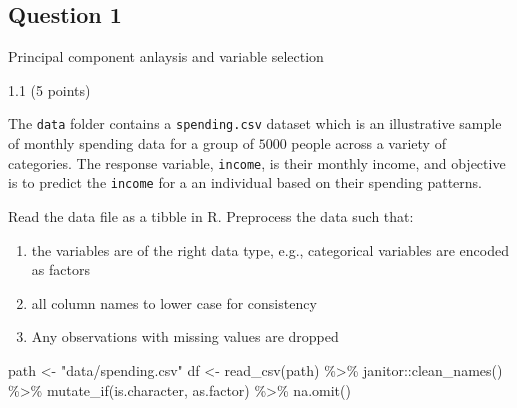 \documentclass[
  letterpaper,
  DIV=11,
  numbers=noendperiod]{scrartcl}
\newenvironment{Shaded}{\begin{snugshade}}{\end{snugshade}}
\newcommand{\FunctionTok}[1]{\textcolor[rgb]{0.28,0.35,0.67}{#1}}
\newcommand{\NormalTok}[1]{\textcolor[rgb]{0.00,0.23,0.31}{#1}}
\newcommand{\OtherTok}[1]{\textcolor[rgb]{0.00,0.23,0.31}{#1}}
\newcommand{\SpecialCharTok}[1]{\textcolor[rgb]{0.37,0.37,0.37}{#1}}
\newcommand{\StringTok}[1]{\textcolor[rgb]{0.13,0.47,0.30}{#1}}
\providecommand{\tightlist}{%
  \setlength{\itemsep}{0pt}\setlength{\parskip}{0pt}}\usepackage{longtable,booktabs,array}
\begin{document}
\subsection{\texorpdfstring{}{ }}\label{section}

\subsection{Question 1}\label{question-1}

\begin{tcolorbox}[enhanced jigsaw, leftrule=.75mm, rightrule=.15mm, left=2mm, colframe=quarto-callout-tip-color-frame, bottomtitle=1mm, colbacktitle=quarto-callout-tip-color!10!white, titlerule=0mm, breakable, opacitybacktitle=0.6, coltitle=black, arc=.35mm, colback=white, title=\textcolor{quarto-callout-tip-color}{\faLightbulb}\hspace{0.5em}{70 points}, toptitle=1mm, toprule=.15mm, bottomrule=.15mm, opacityback=0]

Principal component anlaysis and variable selection

\end{tcolorbox}

1.1 (5 points)

The \texttt{data} folder contains a \texttt{spending.csv} dataset which
is an illustrative sample of monthly spending data for a group of
\(5000\) people across a variety of categories. The response variable,
\texttt{income}, is their monthly income, and objective is to predict
the \texttt{income} for a an individual based on their spending
patterns.

Read the data file as a tibble in R. Preprocess the data such that:

\begin{enumerate}
\def\labelenumi{\arabic{enumi}.}
\tightlist
\item
  the variables are of the right data type, e.g., categorical variables
  are encoded as factors
\item
  all column names to lower case for consistency
\item
  Any observations with missing values are dropped
\end{enumerate}

\begin{Shaded}
\begin{Highlighting}[]
\NormalTok{path }\OtherTok{\textless{}{-}} \StringTok{"data/spending.csv"}
\NormalTok{df }\OtherTok{\textless{}{-}} \FunctionTok{read\_csv}\NormalTok{(path) }\SpecialCharTok{\%\textgreater{}\%}
\NormalTok{  janitor}\SpecialCharTok{::}\FunctionTok{clean\_names}\NormalTok{() }\SpecialCharTok{\%\textgreater{}\%}
  \FunctionTok{mutate\_if}\NormalTok{(is.character, as.factor) }\SpecialCharTok{\%\textgreater{}\%}
  \FunctionTok{na.omit}\NormalTok{()}
\end{Highlighting}
\end{Shaded}
\end{document}
